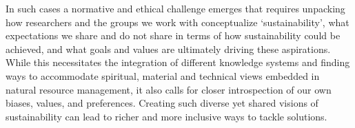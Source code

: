 \documentclass[10pt,a4paper]{article}
\renewcommand*{\refname}{References and Notes}
\begin{document}
\begin{multicols}{2}
In such cases a normative and ethical challenge emerges that requires unpacking how researchers and the groups we work with conceptualize `sustainability', what expectations we share and do not share in terms of how sustainability could be achieved, and what goals and values are ultimately driving these aspirations. While this necessitates the integration of different knowledge systems \citep{r45} and finding ways to accommodate spiritual, material and technical views embedded in natural resource management, it also calls for closer introspection of our own biases, values, and preferences. Creating such diverse yet shared visions of sustainability \citep{r46} can lead to richer and more inclusive ways to tackle solutions.

\end{multicols}

\vspace{\baselineskip}

\begin{multicols}{2}
\renewcommand*{\refname}{\normalsize{References and Notes}}

\begin{footnotesize}


\end{footnotesize}

\end{multicols}
\end{document}
